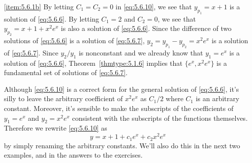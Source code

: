 \documentclass{ximera}
\begin{document}
\begin{example}
\begin{explanation}
\ref{item:5.6.1b} By letting $C_1=C_2=0$ in \eqref{eq:5.6.10}, we see that
$y_{p_1}=x+1$ is a solution of \eqref{eq:5.6.6}. By letting $C_1=2$ and
$C_2=0$, we see that $y_{p_2}=x+1+x^2e^x$ is also a solution of
\eqref{eq:5.6.6}. Since the difference of two solutions of \eqref{eq:5.6.6} is
a solution of \eqref{eq:5.6.7},
$y_2=y_{p_1}-y_{p_2}=x^2e^x$ is a solution of \eqref{eq:5.6.7}. Since
$y_2/y_1$ is nonconstant and we already know  that $y_1=e^x$ is a
solution of \eqref{eq:5.6.6}, Theorem~\ref{thmtype:5.1.6} implies that
$\{e^x,x^2e^x\}$ is a fundamental set of solutions of
\eqref{eq:5.6.7}.
\end{explanation}
\end{example}
 
Although \eqref{eq:5.6.10} is a correct form for the general solution of
\eqref{eq:5.6.6}, it's silly to leave the arbitrary coefficient of
$x^2e^x$ as $C_1/2$ where $C_1$ is an arbitrary constant. Moreover, it's
sensible to make the subscripts of the coefficients of $y_1=e^x$ and
$y_2=x^2e^x$ consistent with the subscripts of the functions
themselves. Therefore we rewrite \eqref{eq:5.6.10} as $$
y=x+1+c_1e^x+c_2x^2e^x $$ by simply renaming the arbitrary constants.
We'll also do this in the next two examples, and in the answers to
the exercises.
 
\end{document}
